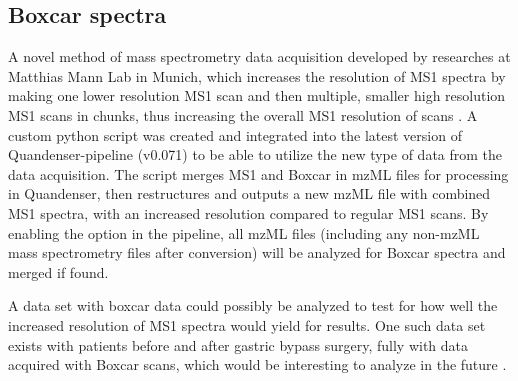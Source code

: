 \subsection{Boxcar spectra}
A novel method of mass spectrometry data acquisition developed by researches at Matthias Mann Lab in Munich, which increases the resolution of MS1 spectra by making one lower resolution MS1 scan and then multiple, smaller high resolution MS1 scans in chunks, thus increasing the overall MS1 resolution of scans \cite{boxcar}. A custom python script was created and integrated into the latest version of Quandenser-pipeline (v0.071) to be able to utilize the new type of data from the data acquisition. The script merges MS1 and Boxcar in mzML files for processing in Quandenser, then restructures and outputs a new mzML file with combined MS1 spectra, with an increased resolution compared to regular MS1 scans. By enabling the option in the pipeline, all mzML files (including any non-mzML mass spectrometry files after conversion) will be analyzed for Boxcar spectra and merged if found.

A data set with boxcar data could possibly be analyzed to test for how well the increased resolution of MS1 spectra would yield for results. One such data set exists with patients before and after gastric bypass surgery, fully with data acquired with Boxcar scans, which would be interesting to analyze in the future \cite{boxcar-data}.
